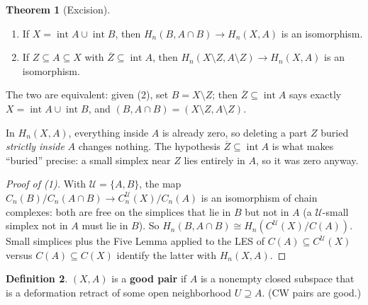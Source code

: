 \documentclass[11pt]{article}
\theoremstyle{definition}
\newtheorem{thm}{Theorem}[section]
\newtheorem{defn}[thm]{Definition}
\begin{document}
\begin{thm}[Excision]
\begin{enumerate}
\item If $X=\operatorname{int}A\cup\operatorname{int}B$, then $H_n(B,A\cap B)\to H_n(X,A)$ is an isomorphism.
\item If $Z\subseteq A\subseteq X$ with $\overline Z\subseteq\operatorname{int}A$, then $H_n(X\setminus Z,A\setminus Z)\to H_n(X,A)$ is an isomorphism.
\end{enumerate}
\end{thm}
The two are equivalent: given (2), set $B=X\setminus Z$; then $\overline Z\subseteq\operatorname{int}A$ says exactly $X=\operatorname{int}A\cup\operatorname{int}B$, and $(B,A\cap B)=(X\setminus Z,A\setminus Z)$.
\begin{intuition}
In $H_n(X,A)$, everything inside $A$ is already zero, so deleting a part $Z$ buried \emph{strictly inside} $A$ changes nothing. The hypothesis $\overline Z\subseteq\operatorname{int}A$ is what makes ``buried'' precise: a small simplex near $Z$ lies entirely in $A$, so it was zero anyway.
\end{intuition}
\begin{proof}[Proof of (1)]
With $\mathcal U=\{A,B\}$, the map $C_n(B)/C_n(A\cap B)\to C^{\mathcal U}_n(X)/C_n(A)$ is an isomorphism of chain complexes: both are free on the simplices that lie in $B$ but not in $A$ (a $\mathcal U$-small simplex not in $A$ must lie in $B$). So $H_n(B,A\cap B)\cong H_n(C^{\mathcal U}(X)/C(A))$. Small simplices plus the Five Lemma applied to the LES of $C(A)\subseteq C^{\mathcal U}(X)$ versus $C(A)\subseteq C(X)$ identify the latter with $H_n(X,A)$.
\end{proof}

\begin{defn}
$(X,A)$ is a \textbf{good pair} if $A$ is a nonempty closed subspace that is a deformation retract of some open neighborhood $U\supseteq A$. (CW pairs are good.)
\end{defn}
\end{document}

